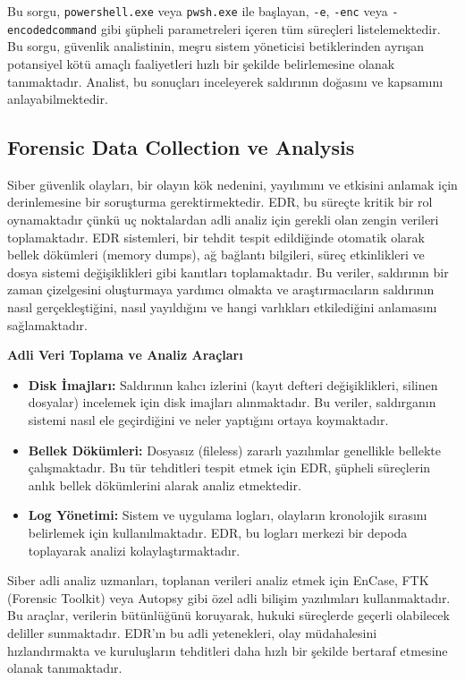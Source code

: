 Bu sorgu, \texttt{powershell.exe} veya \texttt{pwsh.exe} ile başlayan, \texttt{-e}, \texttt{-enc} veya \texttt{-encodedcommand} gibi şüpheli parametreleri içeren tüm süreçleri listelemektedir. Bu sorgu, güvenlik analistinin, meşru sistem yöneticisi betiklerinden ayrışan potansiyel kötü amaçlı faaliyetleri hızlı bir şekilde belirlemesine olanak tanımaktadır. Analist, bu sonuçları inceleyerek saldırının doğasını ve kapsamını anlayabilmektedir.

\subsection{Forensic Data Collection ve Analysis}

Siber güvenlik olayları, bir olayın kök nedenini, yayılımını ve etkisini anlamak için derinlemesine bir soruşturma gerektirmektedir. EDR, bu süreçte kritik bir rol oynamaktadır çünkü uç noktalardan adli analiz için gerekli olan zengin verileri toplamaktadır. EDR sistemleri, bir tehdit tespit edildiğinde otomatik olarak bellek dökümleri (memory dumps), ağ bağlantı bilgileri, süreç etkinlikleri ve dosya sistemi değişiklikleri gibi kanıtları toplamaktadır. Bu veriler, saldırının bir zaman çizelgesini oluşturmaya yardımcı olmakta ve araştırmacıların saldırının nasıl gerçekleştiğini, nasıl yayıldığını ve hangi varlıkları etkilediğini anlamasını sağlamaktadır.

\textbf{Adli Veri Toplama ve Analiz Araçları}
\begin{itemize}
    \item \textbf{Disk İmajları:} Saldırının kalıcı izlerini (kayıt defteri değişiklikleri, silinen dosyalar) incelemek için disk imajları alınmaktadır. Bu veriler, saldırganın sistemi nasıl ele geçirdiğini ve neler yaptığını ortaya koymaktadır.
    \item \textbf{Bellek Dökümleri:} Dosyasız (fileless) zararlı yazılımlar genellikle bellekte çalışmaktadır. Bu tür tehditleri tespit etmek için EDR, şüpheli süreçlerin anlık bellek dökümlerini alarak analiz etmektedir.
    \item \textbf{Log Yönetimi:} Sistem ve uygulama logları, olayların kronolojik sırasını belirlemek için kullanılmaktadır. EDR, bu logları merkezi bir depoda toplayarak analizi kolaylaştırmaktadır.
\end{itemize}

Siber adli analiz uzmanları, toplanan verileri analiz etmek için EnCase, FTK (Forensic Toolkit) veya Autopsy gibi özel adli bilişim yazılımları kullanmaktadır. Bu araçlar, verilerin bütünlüğünü koruyarak, hukuki süreçlerde geçerli olabilecek deliller sunmaktadır. EDR'ın bu adli yetenekleri, olay müdahalesini hızlandırmakta ve kuruluşların tehditleri daha hızlı bir şekilde bertaraf etmesine olanak tanımaktadır.

